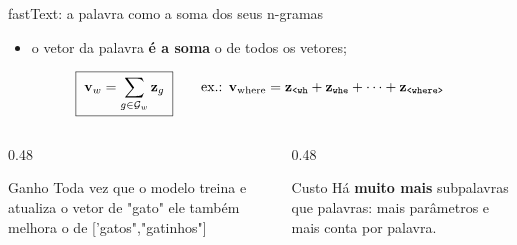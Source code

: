 \begin{frame}{fastText: a palavra como a soma dos seus n-gramas \cite{bojanowski2017enriching}}
    \vspace{-0.05cm}
    \raggedright
    \scriptsize
    \begin{itemize}
        \item o vetor da palavra \textbf{é a soma} o de todos os vetores;
    \end{itemize}
    \vspace{0.1cm}
    \begin{equation*}
        \boxed{\;\mathbf{v}_w = \sum_{g \in \mathcal{G}_w} \mathbf{z}_g\;}
        \qquad
        \text{ex.: } \mathbf{v}_{\text{where}} = \mathbf{z}_{\texttt{<wh}} + \mathbf{z}_{\texttt{whe}} + \cdots + \mathbf{z}_{\texttt{<where>}}
    \end{equation*}
    \vspace{-0.3cm}
    \begin{columns}[t]
        \begin{column}{0.48\textwidth}
            \begin{exampleblock}{Ganho}
                \scriptsize
                Toda vez que o modelo treina e atualiza o vetor de "gato"  ele também melhora o de ['gatos","gatinhos"]
            \end{exampleblock}
        \end{column}
        \begin{column}{0.48\textwidth}
            \begin{alertblock}{Custo}
                \scriptsize
                Há \textbf{muito mais} subpalavras que palavras: mais parâmetros e mais conta por palavra.
            \end{alertblock}
        \end{column}
    \end{columns}


\end{frame}
